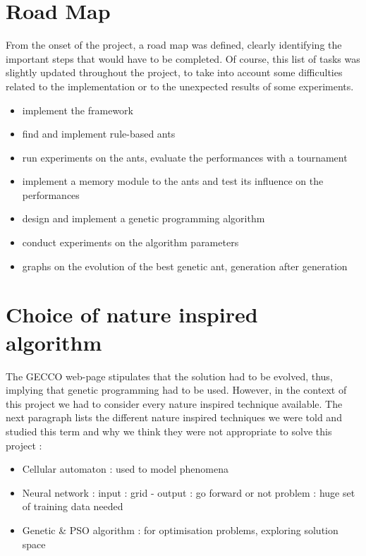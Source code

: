\documentclass[10pt,a4paper]{article}
\begin{document}
\section{Road Map}

From the onset of the project, a road map was defined, clearly
identifying the important steps that would have to be completed. Of
course, this list of tasks was slightly updated throughout the
project, to take into account some difficulties related to the
implementation or to the unexpected results of some experiments.

\begin{itemize}
\item implement the framework
\item find and implement rule-based ants
\item run experiments on the ants, evaluate the performances with a tournament
\item implement a memory module to the ants and test its influence on the performances
\item design and implement a genetic programming algorithm
\item conduct experiments on the algorithm parameters
\item graphs on the evolution of the best genetic ant, generation after generation
\end{itemize}

\section{Choice of nature inspired algorithm}

The GECCO web-page stipulates that the solution had to be evolved,
thus, implying that genetic programming had to be used. However, in
the context of this project we had to consider every nature inspired
technique available. The next paragraph lists the different nature
inspired techniques we were told and studied this term and why we
think they were not appropriate to solve this project :

\begin{itemize}
\item Cellular automaton : used to model phenomena
\item Neural network : input : grid - output : go forward or not
  problem : huge set of training data needed
\item Genetic & PSO algorithm : for optimisation problems, exploring solution space
\end{itemize}
\end{document}
